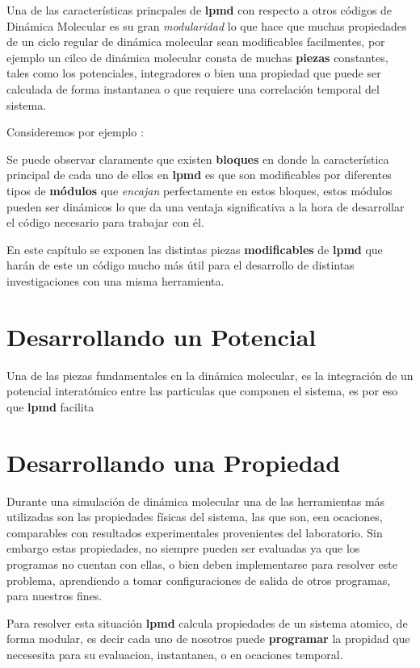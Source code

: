 \documentclass[a4paper,10pt]{scrbook}
\newcommand{\lpmd}{\textbf{lpmd }}
\begin{document}
Una de las caracter\'isticas princpales de \lpmd con respecto a otros c\'odigos de Din\'amica Molecular es su gran \textit{modularidad} lo que hace que muchas propiedades de un ciclo regular de din\'amica molecular sean modificables facilmentes, por ejemplo un cilco de din\'amica molecular consta de muchas \textbf{piezas} constantes, tales como los potenciales, integradores o bien una propiedad que puede ser calculada de forma instantanea o que requiere una correlaci\'on temporal del sistema.

Consideremos por ejemplo :

Se puede observar claramente que existen \textbf{bloques} en donde la caracter\'istica principal de cada uno de ellos en \lpmd es que son modificables por diferentes tipos de \textbf{m\'odulos} que \textit{encajan} perfectamente en estos bloques, estos m\'odulos pueden ser din\'amicos lo que da una ventaja significativa a la hora de desarrollar el c\'odigo necesario para trabajar con \'el.

En este cap\'itulo se exponen las distintas piezas \textbf{modificables} de \lpmd que har\'an de este un c\'odigo mucho m\'as \'util para el desarrollo de distintas investigaciones con una misma herramienta.

\section{Desarrollando un Potencial}

Una de las piezas fundamentales en la din\'amica molecular, es la integraci\'on de un potencial interat\'omico entre las particulas que componen el sistema, es por eso que \lpmd facilita 

\section{Desarrollando una Propiedad}

Durante una simulaci\'on de din\'amica molecular una de las herramientas m\'as utilizadas  son las propiedades f\'isicas del sistema, las que son, een ocaciones, comparables con resultados experimentales provenientes del laboratorio. Sin embargo estas propiedades, no siempre pueden ser evaluadas ya que los programas no cuentan con ellas, o bien deben implementarse para resolver este problema, aprendiendo a tomar configuraciones de salida de otros programas, para nuestros fines.

Para resolver esta situaci\'on \lpmd calcula propiedades de un sistema atomico, de forma modular, es decir cada uno de nosotros puede \textbf{programar} la propidad que necesesita para su evaluacion, instantanea, o en ocaciones temporal.
\end{document}
